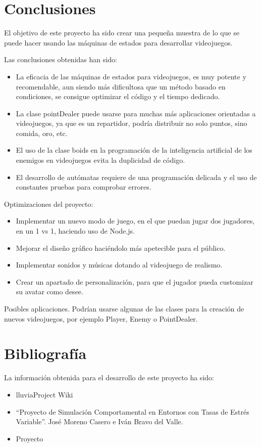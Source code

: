 \documentclass[a4paper,10pt]{article}
\begin{document}
\section{Conclusiones}
El objetivo de este proyecto ha sido crear una pequeña muestra de lo que se puede hacer usando las máquinas de estados para desarrollar videojuegos.

Las conclusiones obtenidas han sido:

\begin{itemize}
 \item La eficacia de las máquinas de estados para videojuegos, 
 es muy potente y recomendable, aun siendo más dificultosa que un método
 basado en condiciones, se consigue optimizar el código y el tiempo dedicado.
 \item La clase pointDealer puede usarse para muchas más 
 aplicaciones orientadas a videojuegos, ya que es un repartidor, 
 podría distribuir no solo puntos, sino comida, oro, etc.
 \item El uso de la clase boids en la programación de la 
 inteligencia artificial de los enemigos 
 en videojuegos evita la duplicidad de código.
 \item El desarrollo de autómatas requiere de una programación delicada 
 y el uso de constantes pruebas para comprobar errores.
\end{itemize}

Optimizaciones del proyecto:
\begin{itemize}
 \item Implementar un nuevo modo de juego, en el que puedan jugar dos jugadores, en un 1 vs 1, haciendo uso de Node.js.
 \item Mejorar el diseño gráfico haciéndolo más apetecible para el público.
 \item Implementar sonidos y músicas dotando al videojuego de realismo.
 \item Crear un apartado de personalización, para que el jugador pueda 
 customizar su avatar como desee.
\end{itemize}

Posibles aplicaciones.
Podrían usarse algunas de las clases para la creación 
de nuevos videojuegos, por ejemplo Player, Enemy o PointDealer.
\cleardoublepage

\section{Bibliografía}
La información obtenida para el desarrollo de este proyecto ha sido:
\begin{itemize}
 \item lluviaProject Wiki
 \item “Proyecto de Simulación Comportamental en Entornos con Tasas de Estrés Variable”. 
 José Moreno Casero e Iván Bravo del Valle.
 \item Proyecto
\end{itemize}
\end{document}
